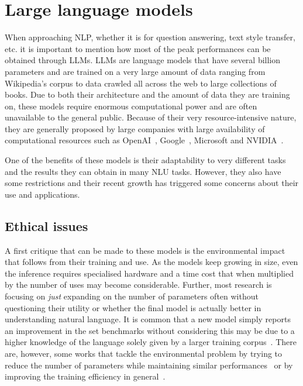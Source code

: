 \documentclass[nomenclature, english, biblatex]{kththesis}
\begin{document}
\section{Large language models}
\label{sec:llm}
When approaching \gls{NLP}, whether it is for question answering, text style transfer, etc. it is important to mention how most of the peak performances can be obtained through \Glspl{LLM}. \Glspl{LLM} are language models
 that have several billion parameters and are trained on a very large amount of data ranging from Wikipedia's corpus to data crawled all across the web to large collections of books. Due to both their architecture and the amount of data they are training on, these models require enormous computational power and are often unavailable to the general public. Because of their very resource-intensive nature, they are generally proposed by large companies with large availability of computational resources such as OpenAI~\cite{brown2020language}, Google~\cite{chowdhery2022palm}, Microsoft and NVIDIA~\cite{smith2022using}. 

One of the benefits of these models is their adaptability to very different tasks and the results they can obtain in many \gls{NLU} tasks. However, they also have some restrictions and their recent growth has triggered some concerns about their use and applications. 
\subsection{Ethical issues}
A first critique that can be made to these models is the environmental impact that follows from their training and use. As the models keep growing in size, even the inference requires specialised hardware and a time cost that when multiplied by the number of uses may become considerable. Further, most research is focusing on \textit{just} expanding on the number of parameters often without questioning their utility or whether the final model is actually better in understanding natural language. It is common that a new model simply reports an improvement in the set benchmarks without considering this may be due to a higher knowledge of the language solely given by a larger training corpus~\cite{bender2021dangers}. There are, however, some works that tackle the environmental problem by trying to reduce the number of parameters while maintaining similar performances~\cite{borgeaud2021improving} or by improving the training efficiency in general~\cite{chowdhery2022palm}.
\end{document}
